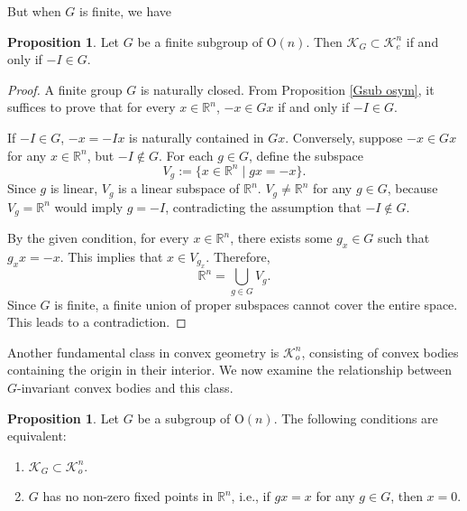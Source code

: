 \documentclass[12pt, reqno]{amsart}
\theoremstyle{definition}
\newtheorem{proposition}[theorem]{Proposition}
\theoremstyle{remark}
\numberwithin{equation}{section}
\newcommand{\On}{\mathrm{O}(n)}
\newcommand{\KG}{\mathcal{K}_{G}}
\begin{document}
	
	But when $G$ is finite, we have
		
		\begin{proposition}\label{finite -i}
			Let \( G \) be a finite subgroup of  \( \mathrm{O}(n) \). 
		Then	$\KG \subset \mathcal{K}^{n}_{e}$ if and only if 
	\(-I\in G\).	
		\end{proposition}
		
		\begin{proof}
		A	finite group $G$ is naturally closed. From Proposition \ref{Gsub osym}, it suffices to prove that for every  \( x \in \mathbb{R}^n \),  \(-x\in Gx\) if and only if \(-I\in G\).
		
			If \(-I\in G\), $-x=-Ix$ is naturally contained in $Gx$.			
Conversely,	suppose \(-x\in Gx\) for any \( x \in \mathbb{R}^n \),  but \(-I \notin G\). For each  \( g \in G \), define the subspace
			\[
			V_g := \{ x \in \mathbb{R}^n \mid g  x = -x \}.
			\]
			Since \( g \) is  linear, \( V_g \) is  a linear subspace of \( \mathbb{R}^n \). \( V_g \neq \mathbb{R}^n \) for any \( g \in G \), because  \( V_g = \mathbb{R}^n \) would imply \( g = -I \), contradicting the assumption that \(-I \notin G\).
				
			By the given condition, for every \( x \in \mathbb{R}^n \), there exists some \( g_x \in G \) such that \( g_{x}  x = -x \). This implies that \( x \in V_{g_x} \). Therefore,
			\[
			\mathbb{R}^n = \bigcup_{g \in G} V_g.
			\]
			Since \( G \) is finite,  a finite union of proper subspaces cannot cover the entire space. This leads to a contradiction.
		\end{proof}
		
	
	
	
	
	
	
	Another fundamental class in convex geometry is $\mathcal{K}_o^n$, consisting of convex bodies containing the origin in their interior. We now examine the relationship between $G$-invariant convex bodies and this class.
	
	\begin{proposition} \label{int1}
		Let \(G\) be a  subgroup of \(\On\). The following conditions are equivalent:
		\begin{enumerate}
			\item $\KG \subset \mathcal{K}^{n}_{o}$.
			\item $G$ has no non-zero fixed points in $\mathbb{R}^n$, i.e., if $gx=x$ for any $g\in G$, then $x=0$.
		\end{enumerate}
	\end{proposition}
	
\end{document}
